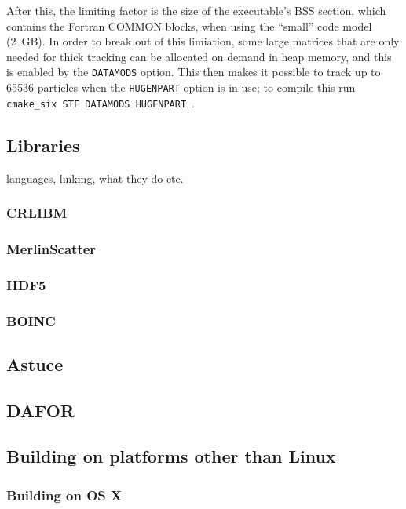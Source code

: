 \documentclass[english]{article}
\begin{document}
After this, the limiting factor is the size of the executable's BSS section, which contains the Fortran COMMON blocks, when using the ``small'' code model (2~GB).
In order to break out of this limiation, some large matrices that are only needed for thick tracking can be allocated on demand in heap memory, and this is enabled by the \texttt{DATAMODS} option.
This then makes it possible to track up to 65536 particles when the \texttt{HUGENPART} option is in use; to compile this run \texttt{cmake\_six STF DATAMODS HUGENPART}~.


\subsection{Libraries}
languages, linking, what they do etc.

\subsubsection{CRLIBM}
\label{sec:building:libs:crlibm}

\subsubsection{MerlinScatter}

\subsubsection{HDF5}

\subsubsection{BOINC}

\subsection{Astuce}

\subsection{DAFOR}

\subsection{Building on platforms other than Linux}

\subsubsection{Building on OS X}
\end{document}
